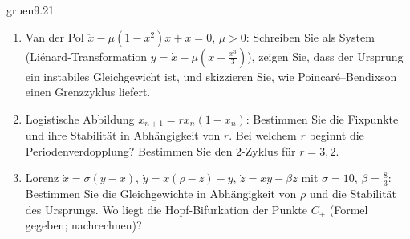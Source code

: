 \begin{karte}{gruen}{9.21}{\typwerk}{}
\begin{enumerate}[label=(\alph*),leftmargin=1.6em,itemsep=2pt]
\item Van der Pol $\ddot x - \mu(1 - x^{2})\dot x + x = 0$, $\mu > 0$: Schreiben Sie als System (Liénard-Transformation $y = \dot x - \mu(x - \frac{x^{3}}3)$), zeigen Sie, dass der Ursprung ein instabiles Gleichgewicht ist, und skizzieren Sie, wie Poincaré--Bendixson einen Grenzzyklus liefert.
\item Logistische Abbildung $x_{n+1} = rx_n(1 - x_n)$: Bestimmen Sie die Fixpunkte und ihre Stabilität in Abhängigkeit von $r$. Bei welchem $r$ beginnt die Periodenverdopplung? Bestimmen Sie den $2$-Zyklus für $r = 3{,}2$.
\item Lorenz $\dot x = \sigma(y - x)$, $\dot y = x(\rho - z) - y$, $\dot z = xy - \beta z$ mit $\sigma = 10$, $\beta = \frac83$: Bestimmen Sie die Gleichgewichte in Abhängigkeit von $\rho$ und die Stabilität des Ursprungs. Wo liegt die Hopf-Bifurkation der Punkte $C_\pm$ (Formel gegeben; nachrechnen)?
\end{enumerate}
\end{karte}

